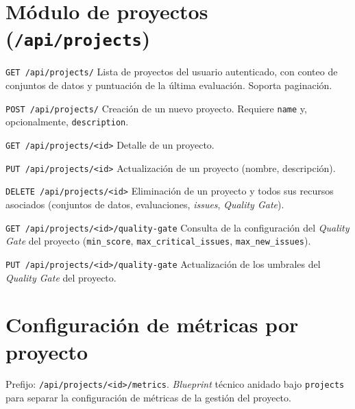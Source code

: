 \section{Módulo de proyectos (\texttt{/api/projects})}
\label{sec:api-projects}

\begin{definitionlist}
  \item[\texttt{GET /api/projects/}]  Lista de proyectos del usuario
    autenticado, con conteo de conjuntos de datos y puntuación de la última
    evaluación.  Soporta paginación.

  \item[\texttt{POST /api/projects/}]  Creación de un nuevo proyecto.
    Requiere \texttt{name} y, opcionalmente, \texttt{description}.

  \item[\texttt{GET /api/projects/<id>}]  Detalle de un proyecto.

  \item[\texttt{PUT /api/projects/<id>}]  Actualización de un proyecto
    (nombre, descripción).

  \item[\texttt{DELETE /api/projects/<id>}]  Eliminación de un proyecto y
    todos sus recursos asociados (conjuntos de datos, evaluaciones,
    \emph{issues}, \emph{Quality Gate}).

  \item[\texttt{GET /api/projects/<id>/quality-gate}]  Consulta de la
    configuración del \emph{Quality Gate} del proyecto (\texttt{min\_score},
    \texttt{max\_critical\_issues}, \texttt{max\_new\_issues}).

  \item[\texttt{PUT /api/projects/<id>/quality-gate}]  Actualización de los
    umbrales del \emph{Quality Gate} del proyecto.
\end{definitionlist}


\section{Configuración de métricas por proyecto}
\label{sec:api-project-metrics}

Prefijo: \texttt{/api/projects/<id>/metrics}.  \emph{Blueprint} técnico
anidado bajo \texttt{projects} para separar la configuración de métricas
de la gestión del proyecto.

